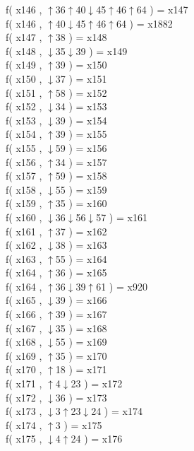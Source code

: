 f( x146 , $\uparrow$36$\uparrow$40$\downarrow$45$\uparrow$46$\uparrow$64 ) = x147 \\
f( x146 , $\uparrow$40$\downarrow$45$\uparrow$46$\uparrow$64 ) = x1882 \\
f( x147 , $\uparrow$38 ) = x148 \\
f( x148 , $\downarrow$35$\downarrow$39 ) = x149 \\
f( x149 , $\uparrow$39 ) = x150 \\
f( x150 , $\downarrow$37 ) = x151 \\
f( x151 , $\uparrow$58 ) = x152 \\
f( x152 , $\downarrow$34 ) = x153 \\
f( x153 , $\downarrow$39 ) = x154 \\
f( x154 , $\uparrow$39 ) = x155 \\
f( x155 , $\downarrow$59 ) = x156 \\
f( x156 , $\uparrow$34 ) = x157 \\
f( x157 , $\uparrow$59 ) = x158 \\
f( x158 , $\downarrow$55 ) = x159 \\
f( x159 , $\uparrow$35 ) = x160 \\
f( x160 , $\downarrow$36$\downarrow$56$\downarrow$57 ) = x161 \\
f( x161 , $\uparrow$37 ) = x162 \\
f( x162 , $\downarrow$38 ) = x163 \\
f( x163 , $\uparrow$55 ) = x164 \\
f( x164 , $\uparrow$36 ) = x165 \\
f( x164 , $\uparrow$36$\downarrow$39$\uparrow$61 ) = x920 \\
f( x165 , $\downarrow$39 ) = x166 \\
f( x166 , $\uparrow$39 ) = x167 \\
f( x167 , $\downarrow$35 ) = x168 \\
f( x168 , $\downarrow$55 ) = x169 \\
f( x169 , $\uparrow$35 ) = x170 \\
f( x170 , $\uparrow$18 ) = x171 \\
f( x171 , $\uparrow$4$\downarrow$23 ) = x172 \\
f( x172 , $\downarrow$36 ) = x173 \\
f( x173 , $\downarrow$3$\uparrow$23$\downarrow$24 ) = x174 \\
f( x174 , $\uparrow$3 ) = x175 \\
f( x175 , $\downarrow$4$\uparrow$24 ) = x176 \\
